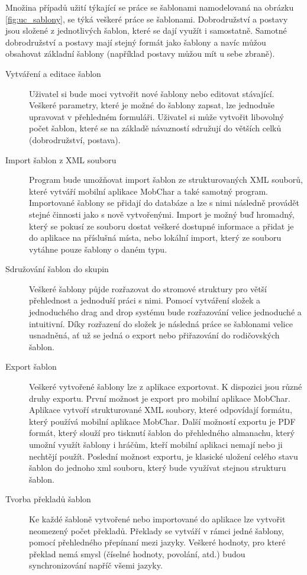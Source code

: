 \documentclass[thesis=B,czech]{resources/FITthesis}[2012/06/26]
\begin{document}
Množina případů užití týkající se práce se šablonami namodelovaná na obrázku \ref{fig:uc_sablony}, se týká veškeré práce se šablonami. Dobrodružství a postavy jsou složené z jednotlivých šablon, které se dají využít i samostatně. Samotné dobrodružství a postavy mají stejný formát jako šablony a navíc můžou obsahovat základní šablony (například postavy můžou mít u sebe zbraně).
\begin{description}
\item[Vytváření a editace šablon] Uživatel si bude moci vytvořit nové šablony nebo editovat stávající. Veškeré parametry, které je možné do šablony zapsat, lze jednoduše upravovat v přehledném formuláři. Uživatel si může vytvořit libovolný počet šablon, které se na základě návazností sdružují do větších celků (dobrodružství, postava).

\item[Import šablon z XML souboru] Program bude umožňovat import šablon ze strukturovaných XML souborů, které vytváří mobilní aplikace MobChar a také samotný program. Importované šablony se přidají do databáze a lze s nimi následně provádět stejné činnosti jako s nově vytvořenými. Import je možný buď hromadný, který se pokusí ze souboru dostat veškeré dostupné informace a přidat je do aplikace na příslušná místa, nebo lokální import, který ze souboru vytáhne pouze šablony o daném typu.

\item[Sdružování šablon do skupin] Veškeré šablony půjde rozřazovat do stromové struktury pro větší přehlednost a jednoduší práci s nimi. Pomocí vytváření složek a jednoduchého drag and drop systému bude rozřazování velice jednoduché a intuitivní. Díky rozřazení do složek je následná práce se šablonami velice usnadněná, ať už se jedná o export nebo přiřazování do rodičovských šablon.

\item[Export šablon] Veškeré vytvořené šablony lze z aplikace exportovat. K dispozici jsou různé druhy exportu. První možnost je export pro mobilní aplikace MobChar. Aplikace vytvoří strukturované XML soubory, které odpovídají formátu, který používá mobilní aplikace MobChar. Další možností exportu je PDF formát, který slouží pro tisknutí šablon do přehledného almanachu, který umožní využít šablony i hráčům, kteří mobilní aplikaci nemají nebo ji nechtějí použít. Poslední možnost exportu, je klasické uložení celého stavu šablon do jednoho xml souboru, který bude využívat stejnou strukturu šablon. 

\item[Tvorba překladů šablon] Ke každé šabloně vytvořené nebo importované do aplikace lze vytvořit neomezený počet překladů. Překlady se vytváří v rámci jedné šablony, pomocí přehledného přepínaní mezi jazyky. Veškeré hodnoty, pro které překlad nemá smysl (číselné hodnoty, povolání, atd.) budou synchronizování napříč všemi jazyky.
\end{description}
\end{document}

